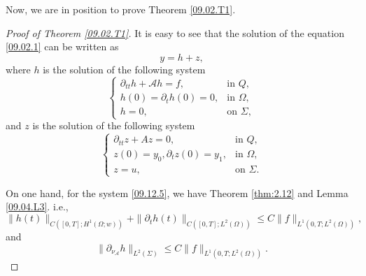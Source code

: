 \documentclass[preprint,12pt]{elsarticle}
\theoremstyle{definition}   %
\numberwithin{equation}{section}
\def\pt{\partial}
\def\pt{\partial}
\def\Om{\Omega}
\def\mcA{\mathcal{A}}
\begin{document}
Now, we are in position to prove Theorem \ref{09.02.T1}. 

\begin{proof}[Proof of Theorem \ref{09.02.T1}]
	It is easy to see that the solution of the equation \eqref{09.02.1} can be written as 
	\begin{equation*}
		y=h+z, 
	\end{equation*}
	where $h$ is the solution of the following system
	\begin{equation}\label{09.12.5}
		\begin{cases}
			\pt_{tt}h+\mcA h=f, &\mbox{in }Q, \\
			h(0)=\pt_th(0)=0, &\mbox{in }\Om,\\
			h=0, &\mbox{on }\Sigma, 
		\end{cases}
	\end{equation}
	and $z$ is the solution of the following system
	\begin{equation}\label{09.12.6}
		\begin{cases}
			\pt_{tt}z+A z=0, &\mbox{in }Q, \\
			z(0)=y_0, \pt_tz(0)=y_1, &\mbox{in }\Om,\\
			z=u, &\mbox{on }\Sigma. 
		\end{cases}
	\end{equation}
	
	On one hand, for the system \eqref{09.12.5}, we have Theorem \ref{thm:2.12} and Lemma \ref{09.04.L3}. i.e., 
	\begin{equation*}
		\|h(t)\|_{C([0,T];H^1(\Om;w))}+\|\pt_t h(t)\|_{C([0,T]; L^2(\Om))}\leq C\|f\|_{L^1(0,T; L^2(\Om))}, 
	\end{equation*}
	and 
	\begin{equation*} 
		\|\pt_{\nu_\mcA} h\|_{L^2(\Sigma)}\leq C \|f\|_{L^1(0,T; L^2(\Om))}.
	\end{equation*}
	

\end{proof}
\end{document}
